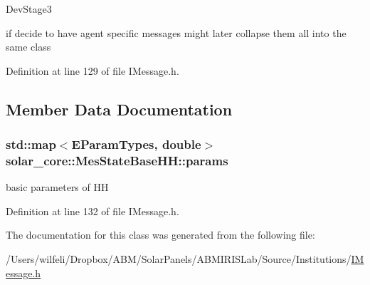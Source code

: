 \begin{DoxyRefDesc}{Dev\+Stage3}
\item[\hyperlink{_dev_stage3__DevStage3000004}{Dev\+Stage3}]if decide to have agent specific messages might later collapse them all into the same class\end{DoxyRefDesc}


Definition at line 129 of file I\+Message.\+h.



\subsection{Member Data Documentation}
\hypertarget{classsolar__core_1_1_mes_state_base_h_h_a75575469dfbf7a86bd1ea95fb85c5194}{}
\subsubsection[{params}]{\setlength{\rightskip}{0pt plus 5cm}std\+::map$<${\bf E\+Param\+Types}, double$>$ solar\+\_\+core\+::\+Mes\+State\+Base\+H\+H\+::params}\label{classsolar__core_1_1_mes_state_base_h_h_a75575469dfbf7a86bd1ea95fb85c5194}
basic parameters of H\+H 

Definition at line 132 of file I\+Message.\+h.



The documentation for this class was generated from the following file\+:\begin{DoxyCompactItemize}
\item 
/\+Users/wilfeli/\+Dropbox/\+A\+B\+M/\+Solar\+Panels/\+A\+B\+M\+I\+R\+I\+S\+Lab/\+Source/\+Institutions/\hyperlink{_i_message_8h}{I\+Message.\+h}\end{DoxyCompactItemize}
